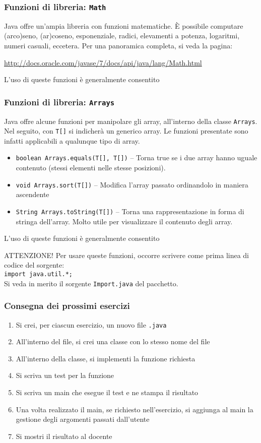 \documentclass{beamer}
\begin{document}
\begin{frame}[fragile]
\frametitle{Funzioni di libreria: \texttt{Math}}
Java offre un'ampia libreria con funzioni matematiche. È possibile computare (arco)seno, (ar)coseno, esponenziale, radici, elevamenti a potenza, logaritmi, numeri casuali, eccetera. Per una panoramica completa, si veda la pagina:

\scriptsize{}
\url{http://docs.oracle.com/javase/7/docs/api/java/lang/Math.html}

\normalsize{}
L'uso di queste funzioni è generalmente consentito
\end{frame}

\begin{frame}[fragile]
\frametitle{Funzioni di libreria: \texttt{Arrays}}
Java offre alcune funzioni per manipolare gli array, all'interno della classe \texttt{Arrays}. Nel seguito, con \texttt{T[]} si indicherà un generico array. Le funzioni presentate sono infatti applicabili a qualunque tipo di array.
\begin{itemize}
 \item \texttt{boolean Arrays.equals(T[], T[])} -- Torna true se i due array hanno uguale contenuto (stessi elementi nelle stesse posizioni). 
 \item \texttt{void Arrays.sort(T[])} -- Modifica l'array passato ordinandolo in maniera ascendente
 \item \texttt{String Arrays.toString(T[])} -- Torna una rappresentazione in forma di stringa dell'array. Molto utile per visualizzare il contenuto degli array.
\end{itemize}
L'uso di queste funzioni è generalmente consentito

\alert{ATTENZIONE!} Per usare queste funzioni, occorre scrivere come prima linea di codice del sorgente:\\
\texttt{import java.util.*;}\\
Si veda in merito il sorgente \texttt{Import.java} del pacchetto.
\end{frame}

\begin{frame}[fragile]
\frametitle{Consegna dei prossimi esercizi}
\begin{enumerate}
 \item Si crei, per ciascun esercizio, un nuovo file \texttt{.java}
 \item All'interno del file, si crei una classe con lo stesso nome del file
 \item All'interno della classe, si implementi la funzione richiesta
 \item Si scriva un test per la funzione
 \item Si scriva un main che esegue il test e ne stampa il risultato
 \item Una volta realizzato il main, se richiesto nell'esercizio, si aggiunga al main la gestione degli argomenti passati dall'utente
 \item Si mostri il risultato al docente
\end{enumerate}
\end{frame}
\end{document}
